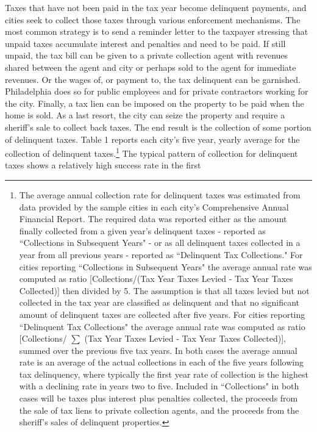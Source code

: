 \documentclass[12pt,titlepage]{article}
\begin{document}
Taxes that have not been paid in the tax year become delinquent
payments, and cities seek to collect those taxes through various
enforcement mechanisms.  The most common strategy is to send a
reminder letter to the taxpayer stressing that unpaid taxes accumulate
interest and penalties and need to be paid.  If still unpaid, the tax
bill can be given to a private collection agent with revenues shared
between the agent and city or perhaps sold to the agent for immediate
revenues.  Or the wages of, or payment to, the tax delinquent can be
garnished.  Philadelphia does so for public employees and for private
contractors working for the city.  Finally, a tax lien can be imposed
on the property to be paid when the home is sold.  As a last resort,
the city can seize the property and require a sheriff's sale to
collect back taxes.  The end result is the collection of some portion
of delinquent taxes.  Table 1 reports each city's five year, yearly
average for the collection of delinquent taxes.\footnote{The average
  annual collection rate for delinquent taxes was estimated from data
  provided by the sample cities in each city's Comprehensive Annual
  Financial Report.  The required data was reported either as the
  amount finally collected from a given year's delinquent taxes -
  reported as ``Collections in Subsequent Years" - or as all
  delinquent taxes collected in a year from all previous years -
  reported as ``Delinquent Tax Collections."  For cities reporting
  ``Collections in Subsequent Years" the average annual rate was
  computed as ratio [Collections/(Tax Year Taxes Levied - Tax Year
    Taxes Collected)] then divided by 5.  The assumption is that all
  taxes levied but not collected in the tax year are classified as
  delinquent and that no significant amount of delinquent taxes are
  collected after five years.  For cities reporting ``Delinquent Tax
  Collections" the average annual rate was computed as ratio
  [Collections/ $\sum$ (Tax Year Taxes Levied - Tax Year Taxes
    Collected)], summed over the previous five tax years.  In both
  cases the average annual rate is an average of the actual
  collections in each of the five years following tax delinquency,
  where typically the first year rate of collection is the highest
  with a declining rate in years two to five.  Included in
  ``Collections" in both cases will be taxes plus interest plus
  penalties collected, the proceeds from the sale of tax liens to
  private collection agents, and the proceeds from the sheriff's
  sales of delinquent properties.} The typical pattern of collection
for delinquent taxes shows a relatively high success rate in the first
\end{document}
